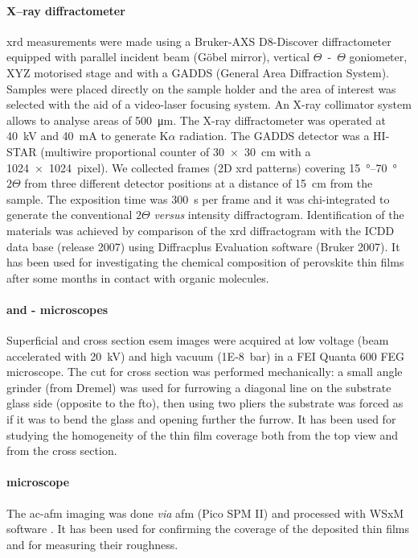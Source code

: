 		\paragraph{X--ray diffractometer}
		\gls{xrd} measurements were made using a Bruker-AXS D8-Discover diffractometer equipped with parallel incident beam (Göbel mirror), vertical $\Theta$~-~$\Theta$ goniometer, XYZ motorised stage and with a GADDS (General Area Diffraction System).
		Samples were placed directly on the sample holder and the area of interest was selected with the aid of a video-laser focusing  system.
		An X-ray collimator system allows to analyse areas of \SI{500}{\um}.
		The X-ray diffractometer was operated at \SI{40}{\kV} and \SI{40}{\mA} to generate  K$\alpha$ radiation.
		The GADDS detector was a HI-STAR (multiwire proportional counter of \SI{30x30}{\cm} with a \SI{1024x1024}{pixel}).
		We collected frames (2D \gls{xrd} patterns) covering \SIrange{15}{70}{\degree} $2\Theta$ from three different detector positions at a distance of \SI{15}{\cm} from the sample.
		The exposition time was \SI{300}{\s} per frame and it was chi-integrated to generate the conventional $2\Theta$ \textsl{versus} intensity diffractogram.
		Identification of the materials was achieved by comparison of the \gls{xrd} diffractogram with the ICDD data base (release 2007) using Diffracplus Evaluation software (Bruker 2007).
		It has been used for investigating the chemical composition of perovskite thin films after some months in contact with organic molecules.

		\paragraph{ and - microscopes}
		Superficial and cross section \gls{esem} images were acquired at low voltage (beam accelerated with \SI{20}{\kV}) and high vacuum (\SI{1E-8}{\bar}) in a FEI Quanta 600 FEG microscope.
		The cut for cross section was performed mechanically: a small angle grinder (from Dremel) was used for furrowing a diagonal line on the substrate glass side (opposite to the \gls{fto}), then using two pliers the substrate was forced as if it was to bend the glass and opening further the furrow.
		It has been used for studying the homogeneity of the thin film coverage both from the top view and from the cross section.

		\paragraph{ microscope}
		The \acrfull{ac-afm} imaging was done \textsl{via} \gls{afm} (Pico SPM II) and processed with WSxM software \cite{Horcas2007}.
		It has been used for confirming the coverage of the deposited thin films and for measuring their roughness.

